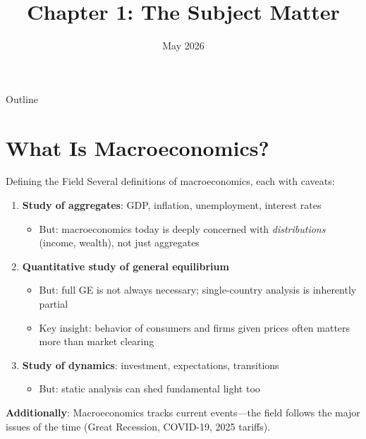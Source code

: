 \documentclass[blue]{beamer}
\title[Chapter1]{Chapter 1: The Subject Matter}
\author[]{}
\date[May 2026]{May 2026}
\begin{document}
  \frame
  {
    \titlepage
  }


\begin{frame}{Outline}
	\tableofcontents
\end{frame}

\section{What Is Macroeconomics?}

\begin{frame}{Defining the Field}
	Several definitions of macroeconomics, each with caveats:
	\vspace{-5pt}
	\begin{enumerate}
		\item \textbf{Study of aggregates}: GDP, inflation, unemployment, interest rates
		\begin{itemize}
			\item But: macroeconomics today is deeply concerned with \emph{distributions} (income, wealth), not just aggregates
		\end{itemize}
		\item \textbf{Quantitative study of general equilibrium}
		\begin{itemize}
			\item But: full GE is not always necessary; single-country analysis is inherently partial
			\item Key insight: behavior of consumers and firms given prices often matters more than market clearing
		\end{itemize}
		\item \textbf{Study of dynamics}: investment, expectations, transitions
		\begin{itemize}
			\item But: static analysis can shed fundamental light too
		\end{itemize}
	\end{enumerate}
		\vspace{-5pt}
	\textbf{Additionally}: Macroeconomics tracks current events---the field follows the major issues of the time (Great Recession, COVID-19, 2025 tariffs).
\end{frame}
\end{document}
